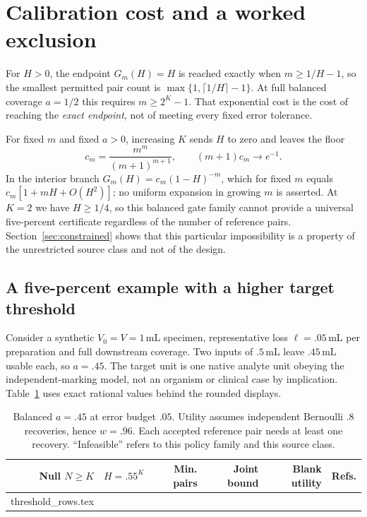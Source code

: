 \documentclass[11pt]{article}
\makeatletter
\let\tableinput\@@input
\theoremstyle{remark}\newtheorem{remark}[theorem]{Remark}
\makeatother
\begin{document}
\section{Calibration cost and a worked exclusion}\label{sec:examples}
For $H>0$, the endpoint $G_m(H)=H$ is reached exactly when $m\ge1/H-1$, so the
smallest permitted pair count is $\max\{1,\lceil1/H\rceil-1\}$. At full balanced
coverage $a=1/2$ this requires $m\ge2^K-1$. That exponential cost is the cost of
reaching the \emph{exact endpoint}, not of meeting every fixed error tolerance.

For fixed $m$ and fixed $a>0$, increasing $K$ sends $H$ to zero and leaves the
floor
\[
c_m=\frac{m^m}{(m+1)^{m+1}},\qquad (m+1)c_m\longrightarrow e^{-1}.
\]
In the interior branch $G_m(H)=c_m(1-H)^{-m}$, which for fixed $m$ equals
$c_m[1+mH+O(H^2)]$; no uniform expansion in growing $m$ is asserted. At $K=2$ we
have $H\ge1/4$, so this balanced gate family cannot provide a universal
five-percent certificate regardless of the number of reference pairs.
Section~\ref{sec:constrained} shows that this particular impossibility is a
property of the unrestricted source class and not of the design.

\subsection{A five-percent example with a higher target threshold}
Consider a synthetic $V_0=V=1\,\mathrm{mL}$ specimen, representative loss
$\ell=.05\,\mathrm{mL}$ per preparation and full downstream coverage. Two inputs
of $.5\,\mathrm{mL}$ leave $.45\,\mathrm{mL}$ usable each, so $a=.45$. The target
unit is one native analyte unit obeying the independent-marking model, not an
organism or clinical case by implication. Table~\ref{tab:thresholds} uses exact
rational values behind the rounded displays.

\begin{table}[tb]
\centering\small
\caption{Balanced $a=.45$ at error budget $.05$. Utility assumes independent
Bernoulli $.8$ recoveries, hence $w=.96$. Each accepted reference pair needs at
least one recovery. ``Infeasible'' refers to this policy family and this source
class.}
\label{tab:thresholds}
\begin{tabular}{@{}rrrrrr@{}}\toprule
Null $N\ge K$ & $H=.55^K$ & Min. pairs & Joint bound & Blank utility & Refs.\\\midrule
\tableinput threshold_rows.tex
\bottomrule\end{tabular}
\end{table}
\end{document}
